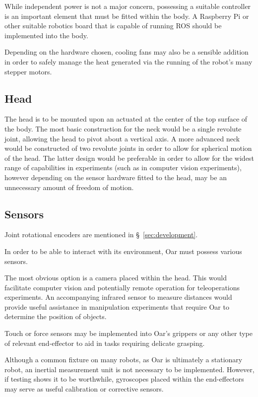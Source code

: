 \documentclass[a4paper,11pt]{article}
\begin{document}
While independent power is not a major concern, possessing a suitable controller is an important element that must be fitted within the body. A Raspberry Pi or other suitable robotics board that is capable of running ROS should be implemented into the body.

Depending on the hardware chosen, cooling fans may also be a sensible addition in order to safely manage the heat generated via the running of the robot's many stepper motors.


\subsection{Head}

The head is to be mounted upon an actuated at the center of the top surface of the body. The most basic construction for the neck would be a single revolute joint, allowing the head to pivot about a vertical axis. A more advanced neck would be constructed of two revolute joints in order to allow for spherical motion of the head. The latter design would be preferable in order to allow for the widest range of capabilities in experiments (such as in computer vision experiments), however depending on the sensor hardware fitted to the head, may be an unnecessary amount of freedom of motion.


\subsection{Sensors}

Joint rotational encoders are mentioned in \S~\ref{sec:development}.

In order to be able to interact with its environment, Oar must possess various sensors.

The most obvious option is a camera placed within the head. This would facilitate computer vision and potentially remote operation for teleoperations experiments. An accompanying infrared sensor to measure distances would provide useful assistance in manipulation experiments that require Oar to determine the position of objects.

Touch or force sensors may be implemented into Oar's grippers or any other type of relevant end-effector to aid in tasks requiring delicate grasping.

Although a common fixture on many robots, as Oar is ultimately a stationary robot, an inertial measurement unit is not necessary to be implemented. However, if testing shows it to be worthwhile, gyroscopes placed within the end-effectors may serve as useful calibration or corrective sensors.
\end{document}
